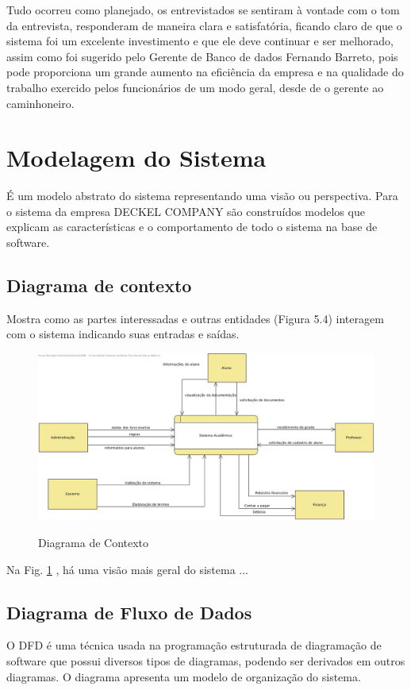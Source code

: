Tudo ocorreu como planejado, os entrevistados se sentiram à vontade com o tom da entrevista, responderam de maneira clara e satisfatória, ficando claro de que o sistema foi um excelente investimento e que ele deve continuar e ser melhorado, assim como foi sugerido pelo Gerente de Banco de dados Fernando Barreto, pois pode proporciona um grande aumento na eficiência da empresa e na qualidade do trabalho exercido pelos funcionários de um modo geral, desde de o gerente ao caminhoneiro.

\section{Modelagem do Sistema}
É um modelo abstrato do sistema representando uma visão ou perspectiva. Para o sistema da empresa DECKEL COMPANY são construídos modelos que explicam as características e o comportamento de todo o sistema na base de software.

\subsection{Diagrama de contexto}
Mostra como as partes interessadas e outras entidades (Figura 5.4) interagem com o sistema indicando suas entradas e saídas.
               

               \begin{figure}[H]
                 \caption{Diagrama de Contexto}
               \centering %
                \includegraphics[width=13cm]{analisedeProjeto/DiagramadeContexto} %
                \label{figura:DiagramadeContexto}
                \end{figure}
                Na Fig. \ref{figura:DiagramadeContexto} , há uma visão mais geral do sistema ...
                

\subsection{Diagrama de Fluxo de Dados}
O DFD é uma técnica usada na programação estruturada de diagramação de software que possui diversos tipos de diagramas, podendo ser derivados em outros diagramas. O diagrama apresenta um modelo de organização do sistema.

